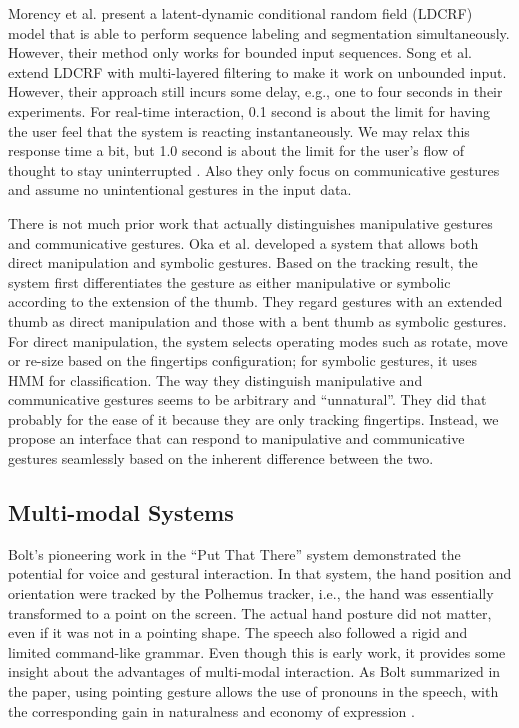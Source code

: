 Morency et al. \cite{morency07} present a latent-dynamic conditional
random field (LDCRF) model that is able to perform sequence labeling and
segmentation simultaneously. However, their method only works for bounded
input sequences. Song et al. \cite{song12} extend LDCRF with multi-layered
filtering to make it work on unbounded input. However, their approach
still incurs some delay, e.g., one to four seconds in their experiments. For
real-time interaction, 0.1 second is about the limit for having the user feel
that the system is reacting instantaneously. We may relax this response time a
bit, but 1.0 second is about the limit for the user's flow of thought to stay
uninterrupted \cite{card91}.  Also they only focus on communicative
gestures and assume no unintentional gestures in the input data.


There is not much prior work that actually distinguishes manipulative gestures
and communicative gestures. Oka et al. \cite{Oka02} developed a system that
allows both direct manipulation and symbolic gestures. Based on the tracking result,
the system first differentiates the gesture as either manipulative or symbolic 
according to the extension of the thumb. They regard gestures with an extended 
thumb as direct manipulation and those with a bent thumb as symbolic gestures. 
For direct manipulation, the system selects operating modes such as rotate, 
move or re-size based on the fingertips configuration; for symbolic gestures, it 
uses HMM for classification. The way they distinguish manipulative and 
communicative gestures seems to be arbitrary and ``unnatural''. They did that 
probably for the ease of it because they are only tracking fingertips.
Instead, we propose an interface that can respond to manipulative and
communicative gestures seamlessly based on the inherent difference between the two.

\subsection{Multi-modal Systems}
Bolt's pioneering work in the ``Put That There'' system \cite{Bolt80} 
demonstrated the potential for voice and gestural interaction.  In that system, 
the hand position and orientation were tracked by the Polhemus tracker, i.e.,
the hand was essentially transformed to a point on the screen. The actual hand 
posture did not matter, even if it was not in a pointing shape. The speech also 
followed a rigid and limited command-like grammar. Even though this is early 
work, it provides some insight about the advantages of multi-modal interaction. 
As Bolt summarized in the paper, using pointing gesture allows the use of 
pronouns in the speech, with the corresponding gain in naturalness and economy 
of expression \cite{Bolt80}.

